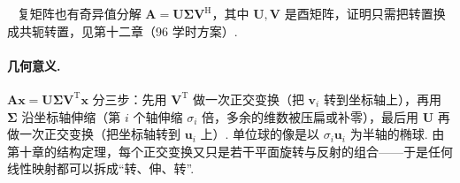 \documentclass[lang=cn,10.5pt,scheme=chinese,toc=twocol,section,chinesefont=nofont,
twoside,citestyle=gb7714-2015,bibstyle=gb7714-2015]{elegantbook}
\DeclareRobustCommand{\textbf}[1]{{\lnsemiboldlatin\lnsemiboldcjk #1}}
\newcommand{\vv}[1]{\boldsymbol{#1}}
\newcommand{\trans}{\mathrm{T}}             %
\numberwithin{equation}{section}   %
\newcommand{\herm}{\mathrm{H}}              %
\newcommand*{\lnlabel}[1]{{\sffamily\bfseries\color{black}#1}}
\renewenvironment{remark}{\noindent\lnlabel{\remarkname}\ }{\par}
\begin{document}
\begin{remark}
  复矩阵也有奇异值分解 $\vv A=\vv U\vv\Sigma\vv V^{\herm}$，其中 $\vv U,\vv V$ 是酉矩阵，证明只需把转置换成共轭转置，见第十二章（96 学时方案）.%
\end{remark}

\paragraph*{几何意义.} $\vv A\vv x=\vv U\vv\Sigma\vv V^\trans\vv x$ 分三步：先用 $\vv V^\trans$ 做一次正交变换（把 $\vv v_i$ 转到坐标轴上），再用 $\vv\Sigma$ 沿坐标轴伸缩（第 $i$ 个轴伸缩 $\sigma_i$ 倍，多余的维数被压扁或补零），最后用 $\vv U$ 再做一次正交变换（把坐标轴转到 $\vv u_i$ 上）. 单位球的像是以 $\sigma_i\vv u_i$ 为半轴的椭球. 由第十章的结构定理，每个正交变换又只是若干平面旋转与反射的组合——于是\textbf{任何}线性映射都可以拆成“转、伸、转”.
\end{document}
